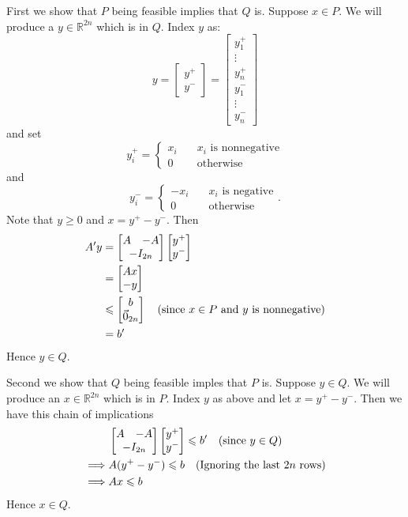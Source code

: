 \documentclass{article}
\begin{document}
First we show that $P$ being feasible implies that $Q$ is. Suppose $x \in P$. We will produce a $y\in \mathbb{R}^{2n}$ which is in $Q$. Index $y$ as:
\[ y = \begin{bmatrix} y^+ \\ y^- \end{bmatrix} = \begin{bmatrix} y^+_1 \\ \vdots \\ y^+_n \\ y^-_1 \\ \vdots \\ y^-_n \end{bmatrix}\]
and set
\[y^+_i = \begin{cases} x_i & \quad \text {$x_i$ is nonnegative} \\ 0 & \quad \text {otherwise} \end{cases}\]
and
\[y^-_i = \begin{cases} -x_i & \quad \text {$x_i$ is negative} \\ 0 & \quad \text {otherwise} \end{cases}.\]
Note that $y \geqslant 0$ and $x = y^+ - y^-$. Then
\begin{align*}
A'y &= \begin{bmatrix} A & -A \\ \multicolumn{2}{c}{-I_{2n}} \end{bmatrix} \begin{bmatrix} y^+ \\ y^- \end{bmatrix} \\
&= \begin{bmatrix} Ax \\ -y \end{bmatrix} \\
&\leqslant \begin{bmatrix} b \\ \vec{0}_{2n} \end{bmatrix} \quad \text {(since $x \in P$ and $y$ is nonnegative)}\\
&= b'
\end{align*}
Hence $y \in Q$.

Second we show that $Q$ being feasible imples that $P$ is. Suppose $y\in Q$. We will produce an $x \in \mathbb{R}^{2n}$ which is in $P$. Index $y$ as above and let $x = y^+ - y^-$. Then we have this chain of implications
\begin{align*}
&\begin{bmatrix} A & -A \\ \multicolumn{2}{c}{-I_{2n}} \end{bmatrix} \begin{bmatrix} y^+ \\ y^- \end{bmatrix} \leqslant b' \quad \text{(since $y \in Q$)}\\
\implies & A(y^+ - y^-) \leqslant b \quad \text{(Ignoring the last $2n$ rows)}\\
\implies & Ax \leqslant b
\end{align*}
Hence $x \in Q$.
\end{document}
